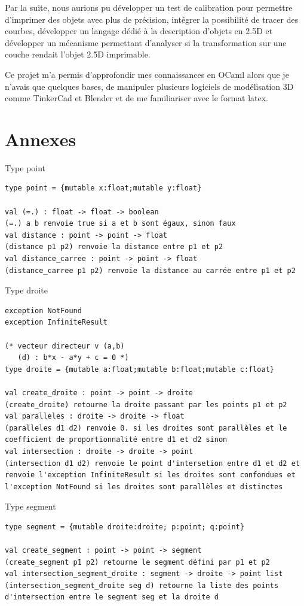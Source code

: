 \documentclass[11pt, titlepage]{article}
\begin{document}
Par la suite, nous aurions pu développer un test de calibration pour permettre d'imprimer des objets avec plus de précision, intégrer la possibilité de tracer des courbes, développer un langage dédié à la description d'objets en 2.5D et développer un mécanisme permettant d'analyser si la transformation sur une couche rendait l'objet 2.5D imprimable.

Ce projet m'a permis d'approfondir mes connaissances en OCaml alors que je n'avais que quelques bases, de manipuler plusieurs logiciels de modélisation 3D comme TinkerCad et Blender et de me familiariser avec le format latex.

\newpage
\section{Annexes}
Type point
\begin{lstlisting}
type point = {mutable x:float;mutable y:float}

val (=.) : float -> float -> boolean
(=.) a b renvoie true si a et b sont égaux, sinon faux       
val distance : point -> point -> float
(distance p1 p2) renvoie la distance entre p1 et p2
val distance_carree : point -> point -> float
(distance_carree p1 p2) renvoie la distance au carrée entre p1 et p2
\end{lstlisting}

Type droite
\begin{lstlisting}
exception NotFound
exception InfiniteResult

(* vecteur directeur v (a,b)
   (d) : b*x - a*y + c = 0 *)
type droite = {mutable a:float;mutable b:float;mutable c:float}

val create_droite : point -> point -> droite
(create_droite) retourne la droite passant par les points p1 et p2
val paralleles : droite -> droite -> float
(paralleles d1 d2) renvoie 0. si les droites sont parallèles et le coefficient de proportionnalité entre d1 et d2 sinon
val intersection : droite -> droite -> point
(intersection d1 d2) renvoie le point d'intersetion entre d1 et d2 et renvoie l'exception InfiniteResult si les droites sont confondues et l'exception NotFound si les droites sont parallèles et distinctes
\end{lstlisting}

Type segment
\begin{lstlisting}
type segment = {mutable droite:droite; p:point; q:point}

val create_segment : point -> point -> segment
(create_segment p1 p2) retourne le segment défini par p1 et p2
val intersection_segment_droite : segment -> droite -> point list
(intersection_segment_droite seg d) retourne la liste des points d'intersection entre le segment seg et la droite d
\end{lstlisting}
\end{document}

